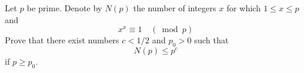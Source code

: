 Let $ p $ be prime. Denote by $ N (p) $ the number of integers $ x $ for which $ 1 \leq x \leq p $ and
$$
x ^ {x} \equiv 1 \quad (\bmod p)
$$Prove that there exist numbers $ c <1/2 $ and $ p_ {0}> 0 $ such that
$$
N (p) \leq p ^ {c}
$$if $ p \ge p_ {0} $.
